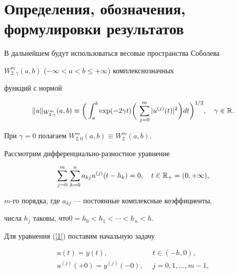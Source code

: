  


\section{Определения, обозначения, формулировки результатов} 


 


В дальнейшем будут использоваться весовые пространства Соболева 


$W^m_{2,\gamma}(a,b)$ ($-\infty<a<b \le+\infty$) комплекснозначных 


функций с нормой 


$$ 


\|u\|_{W^m_{2,\gamma}}(a,b)\equiv\bigg(\int^b_a\exp(-2\gamma t) 


\bigg(\,\sum^m_{j=0}|u^{(j)}(t)|^2\bigg)dt\bigg)^{1/2},\quad 


\gamma\in\Bbb R. 


$$ 


При $\gamma=0$ полагаем $W^m_{2,0}(a,b)\equiv W^m_2(a,b)$. 


 


Рассмотрим дифференциально-разностное уравнение 


\begin{equation} 


\label{1} 


\sum^m_{j=0}\,\sum^n_{k=0}a_{kj}u^{(j)}(t-h_k)=0,\quad 


t\in\Bbb R_+=(0,+\infty), 


\end{equation} 


$m$-го порядка, где $a_{kj}$ --- постоянные комплексные коэффициенты, 


числа $h_j$ таковы, что\linebreak $0=h_0<h_1<\dotsb<h_n<h$. 


 


Для уравнения (\ref{1}) поставим начальную задачу 


\begin{equation} 


\begin{split} 


\label{2} 


u(t)=y(t),\ \;&t\in(-h,0),\\ 


u^{(j)}(+0)=y^{(j)}(-0),\ \;&j=0,1,\dotsc,m-1, 


\end{split} 


\end{equation} 


